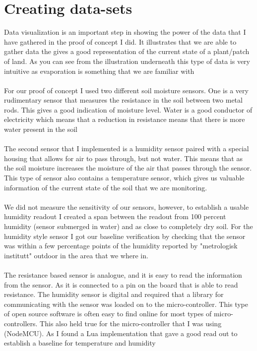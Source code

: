 \documentclass[]{uiophd}
\begin{document}
\section{Creating data-sets}
Data visualization is an important step in showing the power of the data that I have gathered in the proof of concept I did. It illustrates that we are able to gather data the gives a good representation of the current state of a plant/patch of land. As you can see from the illustration underneath this type of data is very intuitive as evaporation is something that we are familiar with
\\\\
For our proof of concept I used two different soil moisture sensors. One is a very rudimentary sensor that measures the resistance in the soil between two metal rods. This gives a good indication of moisture level. Water is a good conductor of electricity which means that a reduction in resistance means that there is more water present in the soil
\\\\
The second sensor that I implemented is a humidity sensor paired with a special housing that allows for air to pass through, but not water. This means that as the soil moisture increases the moisture of the air that passes through the sensor. This type of sensor also contains a temperature sensor, which gives us valuable information of the current state of the soil that we are monitoring.
\\\\
We did not measure the sensitivity of our sensors, however, to establish a usable humidity readout I created a span between the readout from 100 percent humidity (sensor submerged in water) and as close to completely dry soil. For the humidity style sensor I got our baseline verification by checking that the sensor was within a few percentage points of the humidity reported by "metrologisk institutt" outdoor in the area that we where in.
\\\\
The resistance based sensor is analogue, and it is easy to read the information from the sensor. As it is connected to a pin on the board that is able to read resistance. The humidity sensor is digital and required that a library for communicating with the sensor was loaded on to the micro-controller. This type of open source software is often easy to find online for most types of micro-controllers. This also held true for the micro-controller that I was using (NodeMCU). As I found a Lua implementation that gave a good read out to establish a baseline for temperature and humidity
\end{document}
